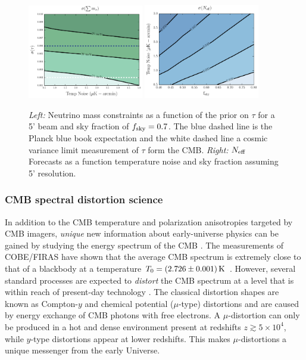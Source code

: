 \begin{figure}[t!]
\begin{center}
\includegraphics[width=0.45\textwidth]{figs/Mnu_tauprior.pdf}
\includegraphics[width=0.45\textwidth]{figs/Neff.pdf}
\caption{ {\it Left:} Neutrino mass constraints as a function of the prior on $\tau$ for a 5' beam and sky fraction of $f_{\rm sky} = 0.7$.  The blue dashed line is the Planck blue book expectation and the white dashed line a cosmic variance limit measurement of $\tau$ form the CMB. {\it Right:} ${N_{\rm eff}}$ Forecasts as a function temperature noise and sky fraction assuming 5' resolution.}
\label{fig:Neff_future}
\end{center}
\end{figure}



\vspace{-0.15in}
\subsubsection{CMB spectral distortion science}
\vspace{-0.05in}

In addition to the CMB temperature and polarization anisotropies targeted by CMB imagers, {\it unique} new information about early-universe physics can be gained by studying the energy spectrum of the CMB \citep{Sunyaev1970SPEC, Burigana1993, Hu1993, Chluba2011therm}. The measurements of COBE/FIRAS have shown that the average CMB spectrum is extremely close to that of a blackbody at a temperature $T_0=(2.726\pm 0.001)\,{\rm K}$ \citep{Mather1994, Fixsen1996}. However, several standard processes are expected to {\it distort} the CMB spectrum \citep[e.g.,][]{Chluba2016LCDM} at a level that is within reach of present-day technology \citep{Kogut2011PIXIE, PRISM2013WPII}. 
%
The classical distortion shapes are known as Compton-$y$ and chemical potential ($\mu$-type) distortions \citep{Zeldovich1969, Sunyaev1970mu} and are caused by energy exchange of CMB photons with free electrons. A $\mu$-distortion can only be produced in a hot and dense environment present at redshifts $z\gtrsim 5\times10^4$, while $y$-type distortions appear at lower redshifts. This makes $\mu$-distortions a unique messenger from the early Universe.

